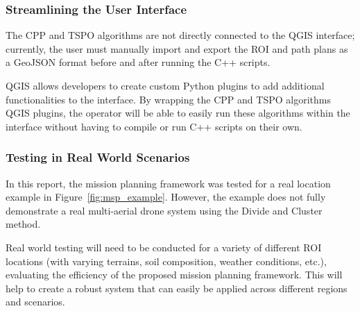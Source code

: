 \subsubsection{Streamlining the User Interface}

The \gls{CPP} and \gls{TSPO} algorithms are not directly connected to the \gls{QGIS} interface; currently, the user must manually import and export the \gls{ROI} and path plans as a GeoJSON format before and after running the C++ scripts. 

\gls{QGIS} allows developers to create custom Python plugins to add additional functionalities to the interface. By wrapping the \gls{CPP} and \gls{TSPO} algorithms \gls{QGIS} plugins, the operator will be able to easily run these algorithms within the interface without having to compile or run C++ scripts on their own. 

\subsubsection{Testing in Real World Scenarios}

In this report, the mission planning framework was tested for a real location example in Figure~\ref{fig:msp_example}. However, the example does not fully demonstrate a real multi-aerial drone system using the Divide and Cluster method.

Real world testing will need to be conducted for a variety of different \gls{ROI} locations (with varying terrains, soil composition, weather conditions, etc.), evaluating the efficiency of the proposed mission planning framework. This will help to create a robust system that can easily be applied across different regions and scenarios. 